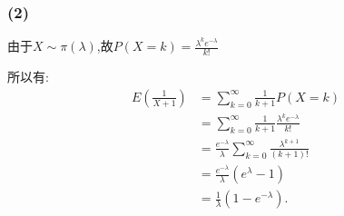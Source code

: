 \documentclass[12pt,a4paper,fontset=none]{ctexart}
\begin{document}
\subsubsection*{(2)}
由于$X\sim \pi(\lambda)$,故$P(X=k)=\frac{\lambda^ke^{-\lambda}}{k!} $

所以有:
\begin{align*}
	E(\frac{1}{X+1} ) & =\sum_{k=0}^{\infty}\frac{1}{k+1}P(X=k)                                      \\
	                  & =\sum_{k=0}^{\infty}\frac{1}{k+1} \frac{\lambda^ke^{-\lambda}}{k!}           \\
	                  & =\frac{e^{-\lambda}}{\lambda}\sum_{k=0}^{\infty}\frac{\lambda^{k+1}}{(k+1)!} \\
	                  & =\frac{e^{-\lambda}}{\lambda}(e^{\lambda}-1)                                 \\
	                  & =\frac{1}{\lambda}(1-e^{-\lambda}).
\end{align*}
\end{document}
